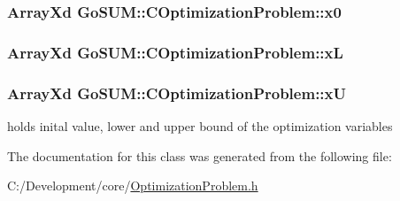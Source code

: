\hypertarget{class_go_s_u_m_1_1_c_optimization_problem_ab2c71b74e7dc5bec96506cc8cce956c7}{
\subsubsection[{x0}]{\setlength{\rightskip}{0pt plus 5cm}Array\-Xd Go\-S\-U\-M\-::\-C\-Optimization\-Problem\-::x0\hspace{0.3cm}{\ttfamily [protected]}}}\label{class_go_s_u_m_1_1_c_optimization_problem_ab2c71b74e7dc5bec96506cc8cce956c7}
\hypertarget{class_go_s_u_m_1_1_c_optimization_problem_a99796cf462106bbaf77978c758870e50}{
\subsubsection[{x\-L}]{\setlength{\rightskip}{0pt plus 5cm}Array\-Xd Go\-S\-U\-M\-::\-C\-Optimization\-Problem\-::x\-L\hspace{0.3cm}{\ttfamily [protected]}}}\label{class_go_s_u_m_1_1_c_optimization_problem_a99796cf462106bbaf77978c758870e50}
\hypertarget{class_go_s_u_m_1_1_c_optimization_problem_a5e0cdecb37f4aace6f10944e2fa9ab3f}{
\subsubsection[{x\-U}]{\setlength{\rightskip}{0pt plus 5cm}Array\-Xd Go\-S\-U\-M\-::\-C\-Optimization\-Problem\-::x\-U\hspace{0.3cm}{\ttfamily [protected]}}}\label{class_go_s_u_m_1_1_c_optimization_problem_a5e0cdecb37f4aace6f10944e2fa9ab3f}
holds inital value, lower and upper bound of the optimization variables 

The documentation for this class was generated from the following file\-:\begin{DoxyCompactItemize}
\item 
C\-:/\-Development/core/\hyperlink{_optimization_problem_8h}{Optimization\-Problem.\-h}\end{DoxyCompactItemize}
